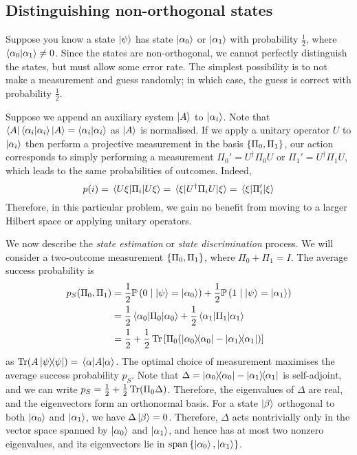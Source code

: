 \subsection{Distinguishing non-orthogonal states}
Suppose you know a state \( \ket{\psi} \) has state \( \ket{\alpha_0} \) or \( \ket{\alpha_1} \) with probability \( \frac{1}{2} \), where \( \ip{\alpha_0}{\alpha_1} \neq 0 \).
Since the states are non-orthogonal, we cannot perfectly distinguish the states, but must allow some error rate.
The simplest possibility is to not make a measurement and guess randomly; in which case, the guess is correct with probability \( \frac{1}{2} \).

Suppose we append an auxiliary system \( \ket{A} \) to \( \ket{\alpha_i} \).
Note that \( \bra{A}\bra{\alpha_i}\ket{\alpha_i}\ket{A} = \ip{\alpha_i}{\alpha_i} \) as \( \ket{A} \) is normalised.
If we apply a unitary operator \( U \) to \( \ket{\alpha_i} \) then perform a projective measurement in the basis \( \qty{\Pi_0, \Pi_1} \), our action corresponds to simply performing a measurement \( \Pi_0' = U^\dagger \Pi_0 U \) or \( \Pi_1' = U^\dagger \Pi_1 U \), which leads to the same probabilities of outcomes.
Indeed,
\[ p(i) = \ev{\Pi_i}{U\xi} = \ev{U^\dagger \Pi_i U}{\xi} = \ev{\Pi_i'}{\xi} \]
Therefore, in this particular problem, we gain no benefit from moving to a larger Hilbert space or applying unitary operators.

We now describe the \emph{state estimation} or \emph{state discrimination} process.
We will consider a two-outcome measurement \( \qty{\Pi_0, \Pi_1} \), where \( \Pi_0 + \Pi_1 = I \).
The average success probability is
\begin{align*}
    p_S(\Pi_0, \Pi_1) &= \frac{1}{2} \prob{0 \mid \ket{\psi} = \ket{\alpha_0}} + \frac{1}{2} \prob{1 \mid \ket{\psi} = \ket{\alpha_1}} \\
    &= \frac{1}{2}\ev{\Pi_0}{\alpha_0} + \frac{1}{2}\ev{\Pi_1}{\alpha_1} \\
    &= \frac{1}{2} + \frac{1}{2} \Tr \qty[\Pi_0 \qty(\op{\alpha_0}{\alpha_0} - \op{\alpha_1}{\alpha_1})]
\end{align*}
as \( \Tr(A\op{\psi}{\psi}) = \ev{A}{\alpha} \).
The optimal choice of measurement maximises the average success probability \( p_S \).
Note that \( \Delta = \op{\alpha_0}{\alpha_0} - \op{\alpha_1}{\alpha_1} \) is self-adjoint, and we can write \( p_S = \frac{1}{2} + \frac{1}{2} \Tr(\Pi_0 \Delta) \).
Therefore, the eigenvalues of \( \Delta \) are real, and the eigenvectors form an orthonormal basis.
For a state \( \ket{\beta} \) orthogonal to both \( \ket{\alpha_0} \) and \( \ket{\alpha_1} \), we have \( \Delta \ket{\beta} = 0 \).
Therefore, \( \Delta \) acts nontrivially only in the vector space spanned by \( \ket{\alpha_0} \) and \( \ket{\alpha_1} \), and hence has at most two nonzero eigenvalues, and its eigenvectors lie in \( \operatorname{span}\qty{\ket{\alpha_0}, \ket{\alpha_1}} \).

